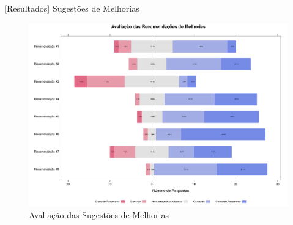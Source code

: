 \documentclass[t,14pt,mathserif]{beamer}
\begin{document}
\begin{frame}{[Resultados] Sugestões de Melhorias}

    \begin{figure}[htpb]
        \centering
        \includegraphics[width=.9\linewidth]{../img/plot_likert_avaliacao_sug_melhorias.pdf}
        \caption{Avaliação das Sugestões de Melhorias}
\label{fig:plot_likert_avaliacao_sug_melhorias}
    \end{figure}

\end{frame}
\end{document}

